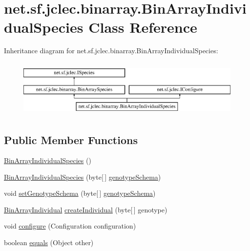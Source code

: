 \hypertarget{classnet_1_1sf_1_1jclec_1_1binarray_1_1_bin_array_individual_species}{\section{net.\-sf.\-jclec.\-binarray.\-Bin\-Array\-Individual\-Species Class Reference}
\label{classnet_1_1sf_1_1jclec_1_1binarray_1_1_bin_array_individual_species}
}
Inheritance diagram for net.\-sf.\-jclec.\-binarray.\-Bin\-Array\-Individual\-Species\-:\begin{figure}[H]
\begin{center}
\leavevmode
\includegraphics[height=2.916667cm]{classnet_1_1sf_1_1jclec_1_1binarray_1_1_bin_array_individual_species}
\end{center}
\end{figure}
\subsection*{Public Member Functions}
\begin{DoxyCompactItemize}
\item 
\hyperlink{classnet_1_1sf_1_1jclec_1_1binarray_1_1_bin_array_individual_species_adf95507b4f49a30ec6c3be36384f6a32}{Bin\-Array\-Individual\-Species} ()
\item 
\hyperlink{classnet_1_1sf_1_1jclec_1_1binarray_1_1_bin_array_individual_species_ad28b73680937e47b71a9c3b45962f38d}{Bin\-Array\-Individual\-Species} (byte\mbox{[}$\,$\mbox{]} \hyperlink{classnet_1_1sf_1_1jclec_1_1binarray_1_1_bin_array_species_ab0e39779362683e78929877e42c7e660}{genotype\-Schema})
\item 
void \hyperlink{classnet_1_1sf_1_1jclec_1_1binarray_1_1_bin_array_individual_species_a2b57176147a22e2dccefc34bfd958234}{set\-Genotype\-Schema} (byte\mbox{[}$\,$\mbox{]} \hyperlink{classnet_1_1sf_1_1jclec_1_1binarray_1_1_bin_array_species_ab0e39779362683e78929877e42c7e660}{genotype\-Schema})
\item 
\hyperlink{classnet_1_1sf_1_1jclec_1_1binarray_1_1_bin_array_individual}{Bin\-Array\-Individual} \hyperlink{classnet_1_1sf_1_1jclec_1_1binarray_1_1_bin_array_individual_species_a45cde066459dffd8e5ef6584b6d55d15}{create\-Individual} (byte\mbox{[}$\,$\mbox{]} genotype)
\item 
void \hyperlink{classnet_1_1sf_1_1jclec_1_1binarray_1_1_bin_array_individual_species_a11ed22273940f1c00b594f155d95e67c}{configure} (Configuration configuration)
\item 
boolean \hyperlink{classnet_1_1sf_1_1jclec_1_1binarray_1_1_bin_array_individual_species_a5038f5bb6531316528ae9be5e078247a}{equals} (Object other)
\end{DoxyCompactItemize}
